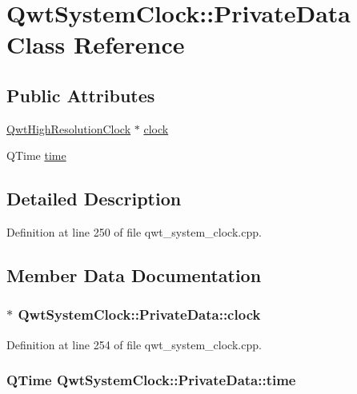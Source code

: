\hypertarget{class_qwt_system_clock_1_1_private_data}{\section{Qwt\-System\-Clock\-:\-:Private\-Data Class Reference}
\label{class_qwt_system_clock_1_1_private_data}
}
\subsection*{Public Attributes}
\begin{DoxyCompactItemize}
\item 
\hyperlink{class_qwt_high_resolution_clock}{Qwt\-High\-Resolution\-Clock} $\ast$ \hyperlink{class_qwt_system_clock_1_1_private_data_a6426d46e9703a3195d4a9c0fb0a40049}{clock}
\item 
Q\-Time \hyperlink{class_qwt_system_clock_1_1_private_data_aa1c509a2b2ed3a9b3fc3b0ac5869eab1}{time}
\end{DoxyCompactItemize}


\subsection{Detailed Description}


Definition at line 250 of file qwt\-\_\-system\-\_\-clock.\-cpp.



\subsection{Member Data Documentation}
\hypertarget{class_qwt_system_clock_1_1_private_data_a6426d46e9703a3195d4a9c0fb0a40049}{
\subsubsection[{clock}]{$\ast$ Qwt\-System\-Clock\-::\-Private\-Data\-::clock}}\label{class_qwt_system_clock_1_1_private_data_a6426d46e9703a3195d4a9c0fb0a40049}


Definition at line 254 of file qwt\-\_\-system\-\_\-clock.\-cpp.

\hypertarget{class_qwt_system_clock_1_1_private_data_aa1c509a2b2ed3a9b3fc3b0ac5869eab1}{
\subsubsection[{time}]{\setlength{\rightskip}{0pt plus 5cm}Q\-Time Qwt\-System\-Clock\-::\-Private\-Data\-::time}}\label{class_qwt_system_clock_1_1_private_data_aa1c509a2b2ed3a9b3fc3b0ac5869eab1}


